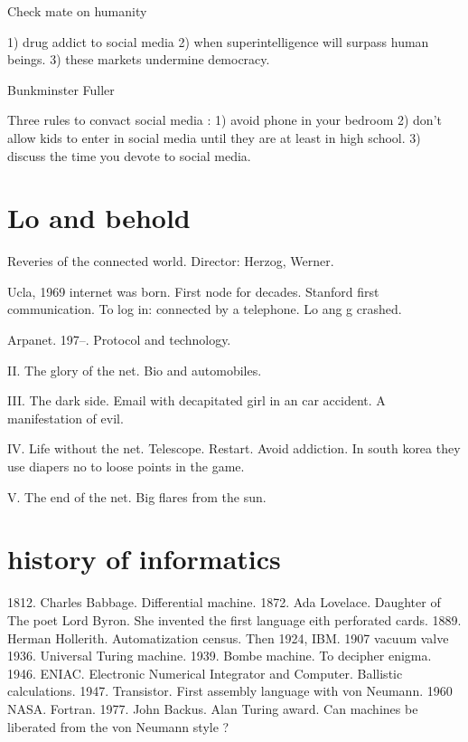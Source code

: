  
 Check mate on humanity 
 
 1) drug addict to social media 
 2) when superintelligence will surpass human beings. 
 3) these markets undermine democracy. 
 
 Bunkminster Fuller 
 
 
 Three rules to convact social media :
 1) avoid phone in your bedroom
 2) don't allow kids to enter in social media until they are at least in high school. 
 3) discuss the time you devote to social media. 
 
 
 
 
  \section{Lo and behold} 
  Reveries of the connected world.  
  Director: Herzog, Werner. 
  
  
  
  Ucla, 1969 internet was born. 
  First node for decades. 
  Stanford first communication. 
  To log in: connected by a telephone. Lo ang g crashed. 
  
  Arpanet. 197--. Protocol and technology. 
  
  II. The glory of the net. Bio and automobiles. 
  
  III. The dark side. 
  Email with decapitated girl in an car accident. 
  A manifestation of evil. 
  
  IV. Life without the net.  Telescope. 
   Restart. Avoid addiction. 
  In south korea they use diapers no to loose points in the game. 
  
  V. The end of the net. Big flares from the sun. 
  
 
 
 
 
 \section{history of informatics}
 1812. Charles Babbage. Differential machine. 
 1872. Ada Lovelace. Daughter of The poet Lord Byron. She invented the first language eith perforated cards. 
 1889. Herman Hollerith. Automatization census. Then 1924, IBM.
 1907 vacuum valve 
 1936. Universal Turing machine. 
 1939. Bombe machine. To decipher enigma. 
 1946. ENIAC. Electronic Numerical Integrator and Computer. Ballistic calculations. 
 1947. Transistor. First assembly language with von Neumann. 
 1960 NASA. Fortran. 
 1977. John Backus. Alan Turing award. Can machines be liberated from the von Neumann style ? 
 
 
 
 
 